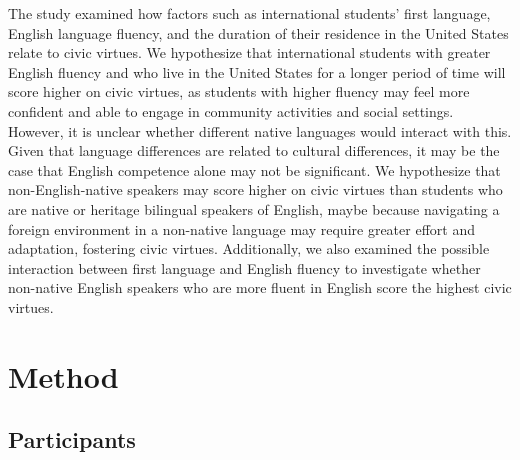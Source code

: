 \documentclass[
  man,
  floatsintext,
  longtable,
  nolmodern,
  notxfonts,
  notimes,
  colorlinks=true,linkcolor=blue,citecolor=blue,urlcolor=blue]{apa7}
\begin{document}
The study examined how factors such as international students' first
language, English language fluency, and the duration of their residence
in the United States relate to civic virtues. We hypothesize that
international students with greater English fluency and who live in the
United States for a longer period of time will score higher on civic
virtues, as students with higher fluency may feel more confident and
able to engage in community activities and social settings. However, it
is unclear whether different native languages would interact with this.
Given that language differences are related to cultural differences, it
may be the case that English competence alone may not be significant. We
hypothesize that non-English-native speakers may score higher on civic
virtues than students who are native or heritage bilingual speakers of
English, maybe because navigating a foreign environment in a non-native
language may require greater effort and adaptation, fostering civic
virtues. Additionally, we also examined the possible interaction between
first language and English fluency to investigate whether non-native
English speakers who are more fluent in English score the highest civic
virtues.

\section{Method}\label{method}

\subsection{Participants}\label{participants}
\end{document}
